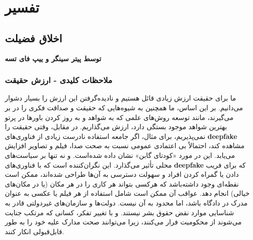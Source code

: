 {
\section*{تفسیر}
\label{sec:تفسیر}

\subsection*{اخلاق فضیلت}
\label{subsec:اخلاق فضیلت}
\noindent \textbf{توسط پیتر سینگر و ییپ فای تسه}
\newline
\newline

\subsubsection*{ملاحظات کلیدی - ارزش حقیقت}
\label{subsubsec:ملاحظات کلیدی - ارزش حقیقت}
ما برای حقیقت ارزش زیادی قائل هستیم و نادیده‌گرفتن این ارزش را بسیار دشوار می‌دانیم. بر این اساس، ما همچنین به شیوه‌هایی که حقیقت و صداقت فکری را در بر می‌گیرند، مانند توسعه روش‌های علمی که به شواهد و به روز کردن باورها در پرتو بهترین شواهد موجود بستگی دارد، ارزش می‌گذاریم. در مقابل، وقتی حقیقت را نمی‌پذیریم، برای مثال، اگر جامعه استفاده نادرست زیادی از فناوری‌های \textenglish{\textbf{deepfake}} مشاهده کند، احتمالاً بی اعتمادی عمومی نسبت به صحت صدا، فیلم و تصاویر افزایش می‌یابد. این در مورد «کودتای گابن» نشان داده شده‌است. و نه تنها بر سیاست‌های محلی تأثیر می‌گذارد. این نگران‌کننده است که با فناوری‌های \textenglish{\textbf{deepfake}} که برای فریب دادن یا گمراه کردن افراد و سهولت دسترسی به آن‌ها طراحی شده‌اند، ممکن است نقطه‌ای وجود داشته‌باشد که هرکسی بتواند هر کاری را در هر مکان (یا در مکان‌های خیالی) انجام دهد. عواقب آن ممکن است شامل استفاده از هر فیلم یا عکسی به عنوان مدرک در دادگاه باشد، اما محدود به آن نیست. دولت‌ها و سازمان‌های غیردولتی قادر به شناسایی موارد نقض حقوق بشر نیستند. و با تغییر تفکر، کسانی که مرتکب جنایت می‌شوند از محکومیت فرار می‌کنند، زیرا می‌توانند صحت مدارک علیه خود را به طور قابل‌قبولی انکار کنند.
\newline
\newline
}


